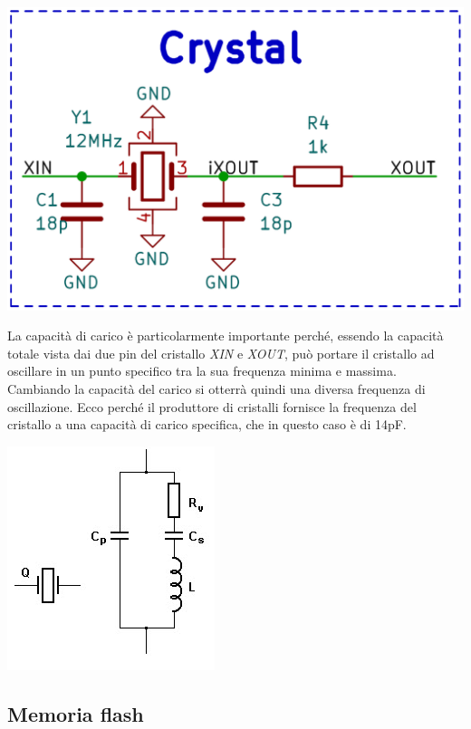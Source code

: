 \begin{center}
\includegraphics[scale=0.2]{figures/image76.png}
\captionsetup{type=figure}
\end{center}

\noindent La capacità di carico è particolarmente importante perché, essendo la
capacità totale vista dai due pin del cristallo \emph{XIN} e \emph{XOUT}, può portare
il cristallo ad oscillare in un punto specifico tra la sua frequenza
minima e massima. Cambiando la capacità del carico si otterrà quindi una
diversa frequenza di oscillazione. Ecco perché il produttore di
cristalli fornisce la frequenza del cristallo a una capacità di carico
specifica, che in questo caso è di 14pF.

\begin{center}
\includegraphics[scale=0.75]{figures/image28.png}
\captionsetup{type=figure}
\end{center}

\hypertarget{memoria-flash}{%
\subsection{\texorpdfstring{Memoria flash}{ Memoria flash}}\label{memoria-flash}}

